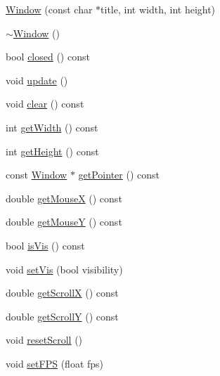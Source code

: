 \begin{DoxyCompactItemize}
\item 
\hyperlink{classspork_1_1graphics_1_1_window_a61957a15dbf07c17924f2da018ff478c}{Window} (const char $\ast$title, int width, int height)
\item 
\hyperlink{classspork_1_1graphics_1_1_window_af802335c30188ec6f226954200c45cde}{$\sim$\+Window} ()
\item 
bool \hyperlink{classspork_1_1graphics_1_1_window_a159afdd9ce89591b3dd14c05fede4047}{closed} () const
\item 
void \hyperlink{classspork_1_1graphics_1_1_window_abee9fd2700c0cde67da0b928d02cc643}{update} ()
\item 
void \hyperlink{classspork_1_1graphics_1_1_window_a5db0b0195bc1871329992ac07a3cfd60}{clear} () const
\item 
int \hyperlink{classspork_1_1graphics_1_1_window_ab2734b9f811991a869da7df83144cf9a}{get\+Width} () const
\item 
int \hyperlink{classspork_1_1graphics_1_1_window_a9b77b4c048725917e6bd2265bd279389}{get\+Height} () const
\item 
const \hyperlink{classspork_1_1graphics_1_1_window}{Window} $\ast$ \hyperlink{classspork_1_1graphics_1_1_window_aa457918a976128ac119987f662383cab}{get\+Pointer} () const
\item 
double \hyperlink{classspork_1_1graphics_1_1_window_a03843054a60415457614ff5a2db46265}{get\+MouseX} () const
\item 
double \hyperlink{classspork_1_1graphics_1_1_window_a5bedfe69db7ed097b8e854532667843d}{get\+MouseY} () const
\item 
bool \hyperlink{classspork_1_1graphics_1_1_window_a4c26d036a1f6f68cbac3eca853ae6fe1}{is\+Vis} () const
\item 
void \hyperlink{classspork_1_1graphics_1_1_window_ac08ef4d4685604b45fe742eb41c89985}{set\+Vis} (bool visibility)
\item 
double \hyperlink{classspork_1_1graphics_1_1_window_a822f29839c96783eab0ee009bc618f6b}{get\+ScrollX} () const
\item 
double \hyperlink{classspork_1_1graphics_1_1_window_a4412cf93f306475fcb3a7549ee5f9811}{get\+ScrollY} () const
\item 
void \hyperlink{classspork_1_1graphics_1_1_window_aab36e127aaad31798d7e4ed5112d42b1}{reset\+Scroll} ()
\item 
void \hyperlink{classspork_1_1graphics_1_1_window_a73fd8ddc91d3dd1c2fe2b25ab44dc69b}{set\+F\+PS} (float fps)

\end{DoxyCompactItemize}
